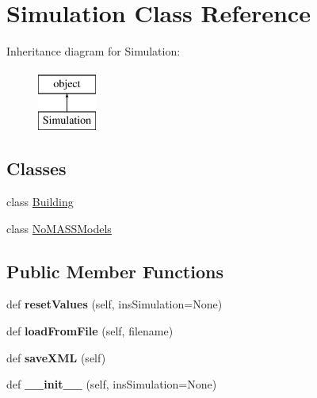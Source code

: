 \hypertarget{class_c_simulation_1_1_simulation}{}\section{Simulation Class Reference}
\label{class_c_simulation_1_1_simulation}
Inheritance diagram for Simulation\+:\begin{figure}[H]
\begin{center}
\leavevmode
\includegraphics[height=2.000000cm]{class_c_simulation_1_1_simulation}
\end{center}
\end{figure}
\subsection*{Classes}
\begin{DoxyCompactItemize}
\item 
class \hyperlink{class_c_simulation_1_1_simulation_1_1_building}{Building}
\item 
class \hyperlink{class_c_simulation_1_1_simulation_1_1_no_m_a_s_s_models}{No\+M\+A\+S\+S\+Models}
\end{DoxyCompactItemize}
\subsection*{Public Member Functions}
\begin{DoxyCompactItemize}
\item 
\mbox{\label{class_c_simulation_1_1_simulation_af75db0b2363c620c161c5bafd913bbee}} 
def {\bfseries reset\+Values} (self, ins\+Simulation=None)
\item 
\mbox{\label{class_c_simulation_1_1_simulation_ab73f20be925ad57108c76f654e796d77}} 
def {\bfseries load\+From\+File} (self, filename)
\item 
\mbox{\label{class_c_simulation_1_1_simulation_ae940cf5d7fed39865f897c6ba1b7801a}} 
def {\bfseries save\+X\+ML} (self)
\item 
\mbox{\label{class_c_simulation_1_1_simulation_a2c21675d320ca1982ea2a5c6874af45b}} 
def {\bfseries \+\_\+\+\_\+init\+\_\+\+\_\+} (self, ins\+Simulation=None)
\end{DoxyCompactItemize}
